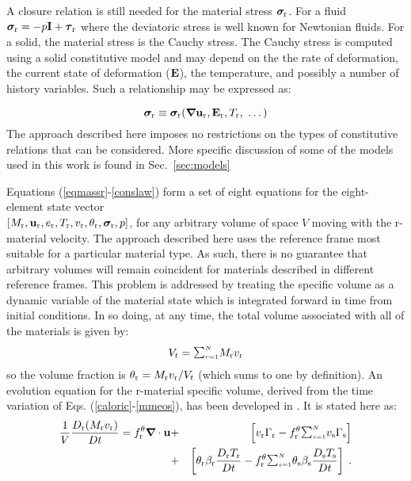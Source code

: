 A closure relation is still needed for the material stress $\sig_\rmr$.
For a fluid $\sig_\rmr = -p\bfI + \taubold_\rmr$ where the deviatoric stress
is well known for Newtonian fluids.  For a solid, the material stress is the
Cauchy stress.  The Cauchy stress is computed using a solid constitutive
model and may depend on the the rate of deformation, the current state of
deformation ($\bfE$), the temperature, and possibly a number of history
variables.  Such a relationship may be expressed as:

%
\begin{equation}
{\sig}_\rmr \equiv \sig_\rmr(\bnabla\bfu_\rmr, \bfE_\rmr, T_\rmr,~ \dots)
\label{conslaw}
\end{equation}
%
The approach described here imposes no restrictions on the types of constitutive relations
that can be considered.  More specific discussion of some of the models
used in this work is found in Sec.~\ref{sec:models}

Equations (\ref{eqmassr}-\ref{conslaw}) form a set of eight equations for
the eight-element state vector \\ $[M_\rmr, \bfu_\rmr, e_\rmr, T_\rmr,
v_\rmr, \theta_\rmr, \sig_\rmr, p]$, for any arbitrary volume of space $V$
moving with the r-material velocity.  The approach described here uses the
reference frame most suitable for a particular material type.  As such,
there is no guarantee that arbitrary volumes will remain coincident for
materials described in different reference frames.  This problem is addressed
by treating the specific volume as a dynamic variable of the material state
which is integrated forward in time from initial conditions.  In so doing,
at any time, the total volume associated with all of the materials is given by:
%
\begin{eqnarray}
V_t = {\raise1.5pt\hbox{$\scriptstyle\sum_{r=1}^N$}} M_\rmr v_\rmr
\end{eqnarray}
%
so the volume fraction is $\theta_\rmr = M_\rmr v_\rmr / V_t$ (which sums
to one by definition).  An evolution equation for the r-material specific
volume, derived from the time variation of Eqs. (\ref{caloric}-\ref{mmeos}),
has been developed in \cite{kashiwa2000}.  It is stated here as:
%
\begin{eqnarray}
{1\over V}{D_\rmr (M_\rmr v_\rmr) \over Dt} =
f_\rmr^{\theta} \bnabla \cdot \bfu &+&
\left[v_\rmr \Gamma_\rmr -
f_\rmr^{\theta} {\raise1.5pt\hbox{$\scriptstyle\sum_{s=1}^N$}}
v_\rms \Gamma_\rms \right]  \nonumber \\ &+&
\left[\theta_\rmr
\beta_\rmr {D_\rmr T_\rmr\over Dt} -
f_\rmr^{\theta} {\raise1.5pt\hbox{$\scriptstyle\sum_{s=1}^N$}}
\theta_\rms \beta_\rms {D_\rms T_\rms\over Dt} \right] \; .
\label{eqspvolr}
\end{eqnarray}

